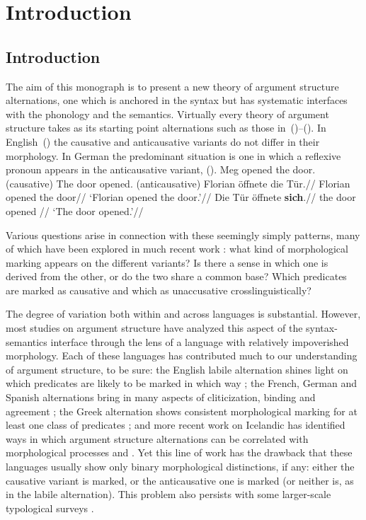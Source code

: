 \chapter{Introduction}
\label{chap:intro}
\section{Introduction}
The aim of this monograph is to present a new theory of argument structure alternations, one which is anchored in the syntax but has systematic interfaces with the phonology and the semantics. Virtually every theory of argument structure takes as its starting point alternations such as those in~(\nextx)--(\anextx). In English~(\nextx) the causative and anticausative variants do not differ in their morphology. In German the predominant situation is one in which a reflexive pronoun appears in the anticausative variant, (\anextx).
\pex
	\a Meg opened the door. \hfill (causative)
 	\a The door opened.			\hfill (anticausative)
\xe
\pex
	\a \begingl
		\gla{}Florian \"offnete die T\"ur.//
		\glb Florian opened the door//
		\glft `Florian opened the door.'//
	\endgl
	\a \begingl
		\gla{}Die T\"ur \"offnete \textbf{sich}.//
		\glb the door opened //
		\glft `The door opened.'//
	\endgl
\xe	

Various questions arise in connection with these seemingly simply patterns, many of which have been explored in much recent work \cite[e.g.][]{unaccusativity95,schaefer08,layering15}: what kind of morphological marking appears on the different variants? Is there a sense in which one is derived from the other, or do the two share a common base? Which predicates are marked as causative and which as unaccusative crosslinguistically?

The degree of variation both within and across languages is substantial. However, most studies on argument structure have analyzed this aspect of the syntax-semantics interface through the lens of a language with relatively impoverished morphology. Each of these languages has contributed much to our understanding of argument structure, to be sure: the English labile alternation shines light on which predicates are likely to be marked in which way \citep{haspelmath93,unaccusativity95,koontzgarboden09}; the French, German and Spanish alternations bring in many aspects of cliticization, binding and agreement \citep{labelle08,schaefer08,cuervo14}; the Greek alternation shows consistent morphological marking for at least one class of predicates \citep{alexiadoudoron12,layering15}; and more recent work on Icelandic has identified ways in which argument structure alternations can be correlated with morphological processes and \cite{wood14nllt,wood15roots,wood15springer}. Yet this line of work has the drawback that these languages usually show only binary morphological distinctions, if any: either the causative variant is marked, or the anticausative one is marked (or neither is, as in the labile alternation). This problem also persists with some larger-scale typological surveys \citep{haspelmath93,arad05}.



